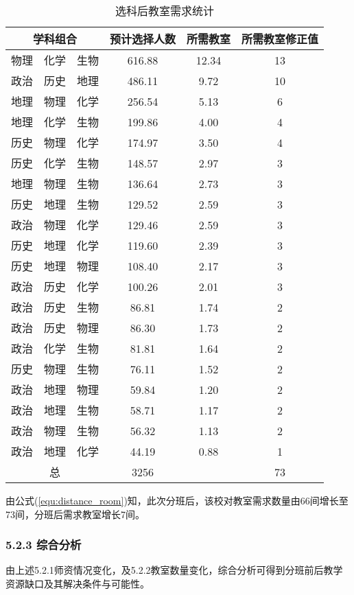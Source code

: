 \documentclass[bwprint]{cumcmthesis}
\begin{document}
\begin{longtable}{cccccc}
	\caption{\label{tab:after_room}选科后教室需求统计}\\
	\toprule
	\multicolumn{3}{c}{学科组合} & 预计选择人数 & 所需教室  & 所需教室修正值 \\
	\midrule
	物理    & 化学    & 生物    & 616.88  & 12.34  & 13 \\
	政治    & 历史    & 地理    & 486.11  & 9.72  & 10 \\
	地理    & 物理    & 化学    & 256.54  & 5.13  & 6 \\
	地理    & 化学    & 生物    & 199.86  & 4.00  & 4 \\
	历史    & 物理    & 化学    & 174.97  & 3.50  & 4 \\
	历史    & 化学    & 生物    & 148.57  & 2.97  & 3 \\
	地理    & 物理    & 生物    & 136.64  & 2.73  & 3 \\
	历史    & 地理    & 生物    & 129.52  & 2.59  & 3 \\
	政治    & 物理    & 化学    & 129.46  & 2.59  & 3 \\
	历史    & 地理    & 化学    & 119.60  & 2.39  & 3 \\
	历史    & 地理    & 物理    & 108.40  & 2.17  & 3 \\
	政治    & 历史    & 化学    & 100.26  & 2.01  & 3 \\
	政治    & 历史    & 生物    & 86.81  & 1.74  & 2 \\
	政治    & 历史    & 物理    & 86.30  & 1.73  & 2 \\
	政治    & 化学    & 生物    & 81.81  & 1.64  & 2 \\
	历史    & 物理    & 生物    & 76.11  & 1.52  & 2 \\
	政治    & 地理    & 物理    & 59.84  & 1.20  & 2 \\
	政治    & 地理    & 生物    & 58.71  & 1.17  & 2 \\
	政治    & 物理    & 生物    & 56.32  & 1.13  & 2 \\
	政治    & 地理    & 化学    & 44.19  & 0.88  & 1 \\
	\midrule
	\multicolumn{3}{c}{总} & 3256  &       & 73 \\
	\bottomrule
\end{longtable}%

由公式(\ref{equ:distance_room})知，此次分班后，该校对教室需求数量由66间增长至73间，分班后需求教室增长7间。

\subsubsection{5.2.3 综合分析}
由上述5.2.1师资情况变化，及5.2.2教室数量变化，综合分析可得到分班前后教学资源缺口及其解决条件与可能性。
\end{document}
